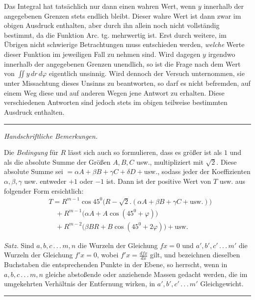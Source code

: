 Das Integral hat tatsächlich nur dann einen wahren Wert, wenn $y$ innerhalb der angegebenen Grenzen stets endlich bleibt. Dieser wahre Wert ist dann zwar im obigen Ausdruck enthalten, aber durch ihn allein noch nicht vollständig bestimmt, da die Funktion Arc. tg. mehrwertig ist. Erst durch weitere, im Übrigen nicht schwierige Betrachtungen muss entschieden werden, \emph{welche}
Werte dieser Funktion im jeweiligen Fall zu nehmen sind. Wird dagegen $y$ irgendwo innerhalb der angegebenen Grenzen unendlich, so ist die Frage nach dem Wert von $\iint y\,dr\,d\varphi$ eigentlich unsinnig. Wird dennoch der Versuch unternommen, sie unter Missachtung dieses Unsinns zu beantworten, so darf es nicht befremden, auf einem Weg diese und auf anderen Wegen jene Antwort zu erhalten. Diese verschiedenen Antworten sind jedoch stets im obigen teilweise bestimmten Ausdruck enthalten.

\par\medskip\noindent\rule{0.25\linewidth}{0.4pt}\par\smallskip
\begingroup\small
\emph{Handschriftliche Bemerkungen.}

Die \emph{Bedingung} für $R$ lässt sich auch so formulieren, dass es größer ist als $1$ und als die absolute Summe der Größen $A,B,C$ usw., multipliziert mit $\surd2$. Diese absolute Summe sei $=\alpha A+\beta B+\gamma C+\delta D+\mathrm{usw.}$, sodass jeder der Koeffizienten $\alpha,\beta,\gamma$ usw. entweder $+1$ oder $-1$ ist. Dann ist der positive Wert von $T$ usw. aus folgender Form ersichtlich:
\[
\begin{aligned}&T=R^{m-1}\cos45^0\bigl(R-\surd2.(\alpha A+\beta B+\gamma C+\mathrm{usw.})\bigr)\\
&\quad+R^{m-1}\bigl(\alpha A+A\cos(45^0+\varphi)\bigr)\\
&\quad+R^{m-2}\bigl(\beta BR+B\cos(45^0+2\varphi)\bigr)+\mathrm{usw.}
\end{aligned}
\]

\emph{Satz.} Sind $a,b,c\,.\,.\,.\,m,n$ die Wurzeln der Gleichung $fx=0$ und $a',b',c'\,.\,.\,.\,m'$ die Wurzeln der Gleichung $f'x=0$, wobei $f'x=\frac{dfx}{dx}$ gilt, und bezeichnen dieselben Buchstaben die entsprechenden Punkte in der Ebene, so herrscht, wenn in $a,b,c\,.\,.\,.\,m,n$ gleiche abstoßende oder anziehende Massen gedacht werden, die im umgekehrten Verhältnis der Entfernung wirken, in $a',b',c'\,.\,.\,.\,m'$ Gleichgewicht.
\endgroup

\par\medskip\begin{center}\rule{0.25\linewidth}{0.4pt}\end{center}

